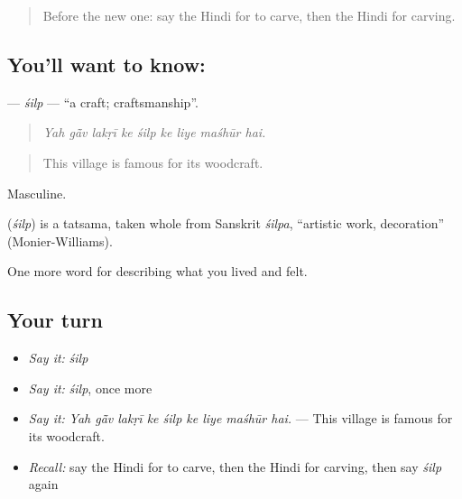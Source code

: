 \label{lesson:HI-C528-silp}



\begin{quote}
Before the new one: say the Hindi for to carve, then the Hindi for carving.
\end{quote}

\subsection*{You'll want to know: }
\textbf{} — \emph{śilp} — \textquotedblleft{}a craft; craftsmanship\textquotedblright{}.

\begin{quote}
        
\end{quote}

\begin{quote}
\emph{Yah gā̃v lakṛī ke śilp ke liye maśhūr hai.}
\end{quote}

\begin{quote}
This village is famous for its woodcraft.
\end{quote}

Masculine.

\begin{cousinweb}
\textbf{} (\emph{śilp}) is a tatsama, taken whole from Sanskrit \emph{śilpa}, \textquotedblleft{}artistic work, decoration\textquotedblright{} (Monier-Williams).
\end{cousinweb}

\begin{grammarlens}[title={What you've built}]
One more word for describing what you lived and felt.
\end{grammarlens}

\subsection*{Your turn}
\begin{itemize}
\raggedright
  \item \emph{Say it:} \emph{śilp}
  \item \emph{Say it:} \emph{śilp}, once more
  \item \emph{Say it:} \emph{Yah gā̃v lakṛī ke śilp ke liye maśhūr hai.} — This village is famous for its woodcraft.
  \item \emph{Recall:} say the Hindi for to carve, then the Hindi for carving, then say \emph{śilp} again
\end{itemize}

